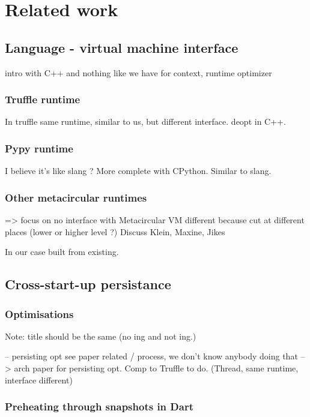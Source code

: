 \documentclass[a4paper,12pt,twoside]{../includes/ThesisStyle}
\begin{document}
\fi

\chapter{Related work}
\label{chap:comparison}
\minitoc

\section{Language - virtual machine interface}

intro with C++ and nothing like we have for context, runtime optimizer

\subsection{Truffle runtime}
In truffle same runtime, similar to us, but different interface. deopt in C++. 

\subsection{Pypy runtime}
I believe it's like slang ? More complete with CPython. Similar to slang.

\subsection{Other metacircular runtimes}

=> focus on no interface with Metacircular VM
different because cut at different places (lower or higher level ?)
Discuss Klein, Maxine, Jikes

In our case built from existing.

\section{Cross-start-up persistance}

\subsection{Optimisations}
Note: title should be the same (no ing and not ing.)

-- persisting opt see paper related / process, we don't know anybody doing that
--> arch paper for persisting opt. Comp to Truffle to do. (Thread, same runtime, interface different)

\subsection{Preheating through snapshots in Dart}
\end{document}
